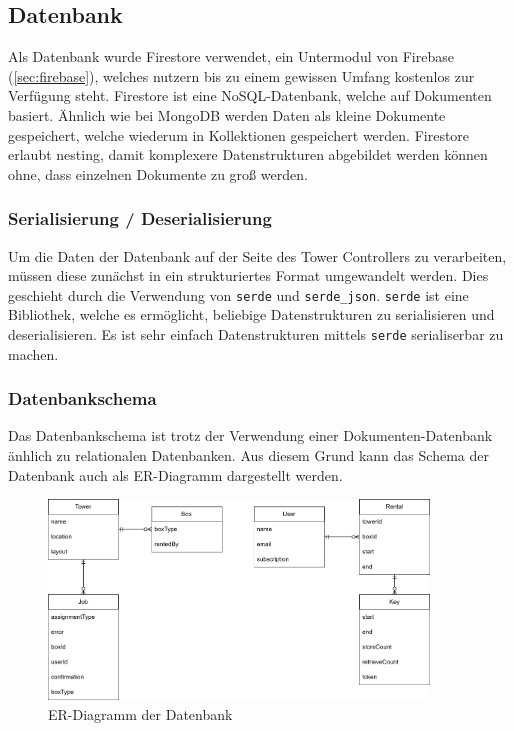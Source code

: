 \subsection{Datenbank}

Als Datenbank wurde Firestore verwendet, ein Untermodul von Firebase (\ref{sec:firebase}), welches nutzern bis zu einem gewissen Umfang kostenlos zur Verfügung steht. Firestore ist eine NoSQL-Datenbank, welche auf Dokumenten basiert. Ähnlich wie bei MongoDB werden Daten als kleine Dokumente gespeichert, welche wiederum in Kollektionen gespeichert werden. Firestore erlaubt nesting, damit komplexere Datenstrukturen abgebildet werden können ohne, dass einzelnen Dokumente zu groß werden.


\subsubsection{Serialisierung / Deserialisierung}

Um die Daten der Datenbank auf der Seite des Tower Controllers zu verarbeiten, müssen diese zunächst in ein strukturiertes Format umgewandelt werden. Dies geschieht durch die Verwendung von \texttt{serde} und \texttt{serde\_json}. \texttt{serde} ist eine Bibliothek, welche es ermöglicht, beliebige Datenstrukturen zu serialisieren und deserialisieren. Es ist sehr einfach Datenstrukturen mittels \texttt{serde} serialiserbar zu machen.


\subsubsection{Datenbankschema}
Das Datenbankschema ist trotz der Verwendung einer Dokumenten-Datenbank änhlich zu relationalen Datenbanken. Aus diesem Grund kann das Schema der Datenbank auch als ER-Diagramm dargestellt werden.

\begin{figure}[H]
    \centering
    \includegraphics[width=0.9\textwidth]{images/datenbankstruktur.png}
    \caption{ER-Diagramm der Datenbank}
    \label{fig:er_diagramm}
\end{figure}


